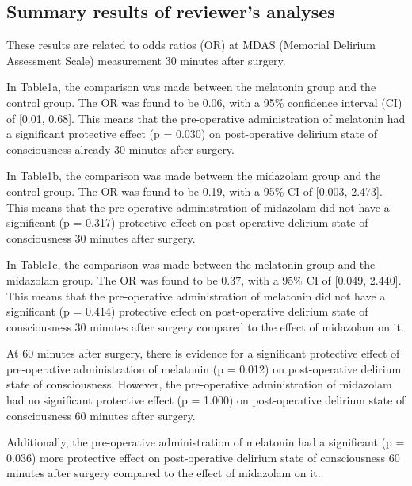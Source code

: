 \documentclass[
]{article}
\begin{document}
\hypertarget{summary-results-of-reviewers-analyses}{%
\subsection{Summary results of reviewer's
analyses}\label{summary-results-of-reviewers-analyses}}

These results are related to odds ratios (OR) at MDAS (Memorial Delirium
Assessment Scale) measurement 30 minutes after surgery.

In Table1a, the comparison was made between the melatonin group and the
control group. The OR was found to be 0.06, with a 95\% confidence
interval (CI) of {[}0.01, 0.68{]}. This means that the pre-operative
administration of melatonin had a significant protective effect (p =
0.030) on post-operative delirium state of consciousness already 30
minutes after surgery.

In Table1b, the comparison was made between the midazolam group and the
control group. The OR was found to be 0.19, with a 95\% CI of {[}0.003,
2.473{]}. This means that the pre-operative administration of midazolam
did not have a significant (p = 0.317) protective effect on
post-operative delirium state of consciousness 30 minutes after surgery.

In Table1c, the comparison was made between the melatonin group and the
midazolam group. The OR was found to be 0.37, with a 95\% CI of
{[}0.049, 2.440{]}. This means that the pre-operative administration of
melatonin did not have a significant (p = 0.414) protective effect on
post-operative delirium state of consciousness 30 minutes after surgery
compared to the effect of midazolam on it.

At 60 minutes after surgery, there is evidence for a significant
protective effect of pre-operative administration of melatonin (p =
0.012) on post-operative delirium state of consciousness. However, the
pre-operative administration of midazolam had no significant protective
effect (p = 1.000) on post-operative delirium state of consciousness 60
minutes after surgery.

Additionally, the pre-operative administration of melatonin had a
significant (p = 0.036) more protective effect on post-operative
delirium state of consciousness 60 minutes after surgery compared to the
effect of midazolam on it.
\end{document}
